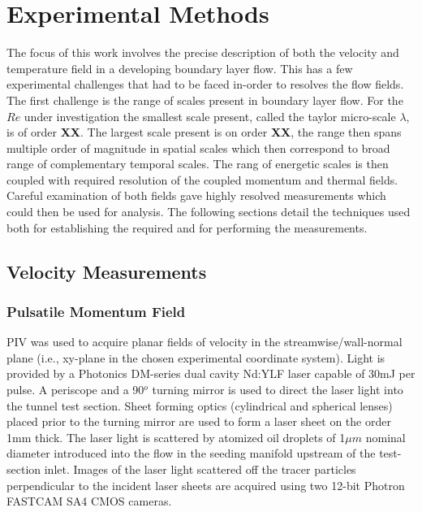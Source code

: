 \chapter{Experimental Methods}
The focus of this work involves the precise description of both the velocity and temperature field in a developing boundary layer flow.
This has a few experimental challenges that had to be faced in-order to resolves the flow fields.
The first challenge is the range of scales present in boundary layer flow.
For the $Re$ under investigation the smallest scale present, called the taylor micro-scale $\lambda$, is of order {\bf XX}.
The largest scale present is on order {\bf XX}, the range then spans multiple order of magnitude in spatial scales which then correspond to broad range of complementary temporal scales.
The rang of energetic scales is then coupled with required resolution of the coupled momentum and thermal fields.
Careful examination of both fields gave highly resolved measurements which could then be used for analysis.
The following sections detail the techniques used both for establishing the required and for performing the measurements.

\section{Velocity Measurements}

\subsection{Pulsatile Momentum Field}

PIV was used to acquire planar fields of velocity in the streamwise/wall-normal plane (i.e., xy-plane in the chosen
experimental coordinate system). %
Light is provided by a Photonics DM-series dual cavity Nd:YLF laser capable of 30mJ per pulse. A periscope and a 90$^o$ turning mirror is used to direct the laser light into the tunnel test section. Sheet forming optics (cylindrical and spherical lenses) placed prior to the turning mirror are used to form a laser sheet on the order 1mm thick. The laser light is scattered by atomized oil droplets of 1$\mu m$ nominal diameter introduced into the flow in the seeding manifold upstream of the test-section inlet. Images of the laser light scattered off the tracer particles perpendicular to the incident laser sheets are acquired using two 12-bit Photron FASTCAM SA4 CMOS cameras. 

